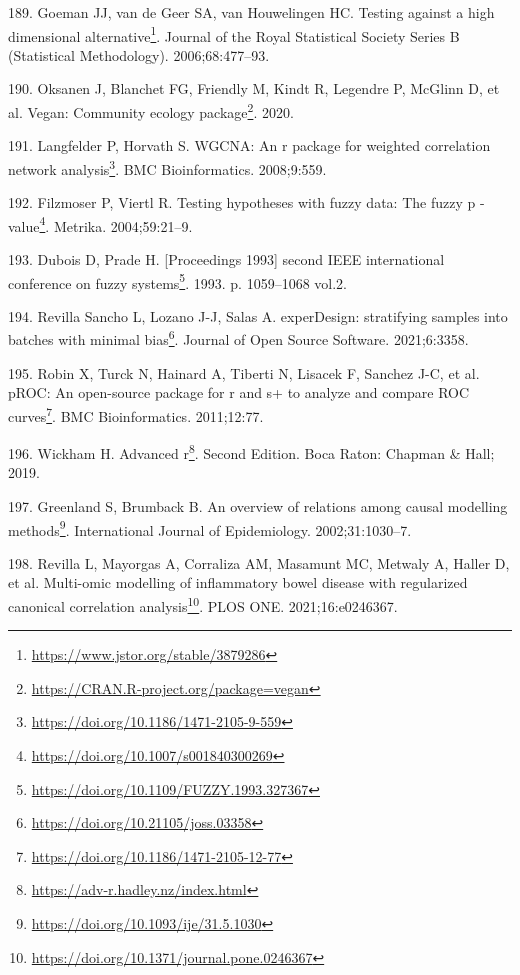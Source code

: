 \documentclass[
  a4paper,
]{book}
\DeclareRobustCommand{\href}[2]{#2\footnote{\url{#1}}}
\newlength{\cslhangindent}
\newlength{\cslentryspacingunit} %
\newenvironment{CSLReferences}[2] %
 {%
  \setlength{\parindent}{0pt}
  \ifodd #1
  \let\oldpar\par
  \def\par{\hangindent=\cslhangindent\oldpar}
  \fi
  \setlength{\parskip}{#2\cslentryspacingunit}
 }%
 {}
\begin{document}
\begin{CSLReferences}{0}{0}
\leavevmode{}%
189. Goeman JJ, van de Geer SA, van Houwelingen HC. \href{https://www.jstor.org/stable/3879286}{Testing against a high dimensional alternative}. Journal of the Royal Statistical Society Series B (Statistical Methodology). 2006;68:477--93.

\leavevmode{}%
190. Oksanen J, Blanchet FG, Friendly M, Kindt R, Legendre P, McGlinn D, et al. \href{https://CRAN.R-project.org/package=vegan}{Vegan: Community ecology package}. 2020.

\leavevmode{}%
191. Langfelder P, Horvath S. \href{https://doi.org/10.1186/1471-2105-9-559}{WGCNA: An r package for weighted correlation network analysis}. BMC Bioinformatics. 2008;9:559.

\leavevmode{}%
192. Filzmoser P, Viertl R. \href{https://doi.org/10.1007/s001840300269}{Testing hypotheses with fuzzy data: The fuzzy p -value}. Metrika. 2004;59:21--9.

\leavevmode{}%
193. Dubois D, Prade H. \href{https://doi.org/10.1109/FUZZY.1993.327367}{{[}Proceedings 1993{]} second IEEE international conference on fuzzy systems}. 1993. p. 1059--1068 vol.2.

\leavevmode{}%
194. Revilla Sancho L, Lozano J-J, Salas A. \href{https://doi.org/10.21105/joss.03358}{experDesign: stratifying samples into batches with minimal bias}. Journal of Open Source Software. 2021;6:3358.

\leavevmode{}%
195. Robin X, Turck N, Hainard A, Tiberti N, Lisacek F, Sanchez J-C, et al. \href{https://doi.org/10.1186/1471-2105-12-77}{pROC: An open-source package for r and s+ to analyze and compare ROC curves}. BMC Bioinformatics. 2011;12:77.

\leavevmode{}%
196. Wickham H. \href{https://adv-r.hadley.nz/index.html}{Advanced r}. Second Edition. Boca Raton: Chapman \& Hall; 2019.

\leavevmode{}%
197. Greenland S, Brumback B. \href{https://doi.org/10.1093/ije/31.5.1030}{An overview of relations among causal modelling methods}. International Journal of Epidemiology. 2002;31:1030--7.

\leavevmode{}%
198. Revilla L, Mayorgas A, Corraliza AM, Masamunt MC, Metwaly A, Haller D, et al. \href{https://doi.org/10.1371/journal.pone.0246367}{Multi-omic modelling of inflammatory bowel disease with regularized canonical correlation analysis}. PLOS ONE. 2021;16:e0246367.


\end{CSLReferences}
\end{document}
